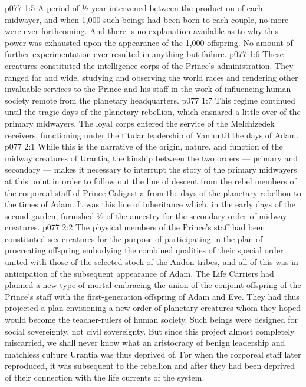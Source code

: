 \vs p077 1:5 A period of ½ year intervened between the production of each midwayer, and when 1,000 such beings had been born to each couple, no more were ever forthcoming. And there is no explanation available as to why this power was exhausted upon the appearance of the 1,000 offspring. No amount of further experimentation ever resulted in anything but failure.
\vs p077 1:6 \pc These creatures constituted the intelligence corps of the Prince’s administration. They ranged far and wide, studying and observing the world races and rendering other invaluable services to the Prince and his staff in the work of influencing human society remote from the planetary headquarters.
\vs p077 1:7 This regime continued until the tragic days of the planetary rebellion, which ensnared a little over  of the primary midwayers. The loyal corps entered the service of the Melchizedek receivers, functioning under the titular leadership of Van until the days of Adam.
\vs p077 2:1 While this is the narrative of the origin, nature, and function of the midway creatures of Urantia, the kinship between the two orders --- primary and secondary --- makes it necessary to interrupt the story of the primary midwayers at this point in order to follow out the line of descent from the rebel members of the corporeal staff of Prince Caligastia from the days of the planetary rebellion to the times of Adam. It was this line of inheritance which, in the early days of the second garden, furnished ½ of the ancestry for the secondary order of midway creatures.
\vs p077 2:2 \pc The physical members of the Prince’s staff had been constituted sex creatures for the purpose of participating in the plan of procreating offspring embodying the combined qualities of their special order united with those of the selected stock of the Andon tribes, and all of this was in anticipation of the subsequent appearance of Adam. The Life Carriers had planned a new type of mortal embracing the union of the conjoint offspring of the Prince’s staff with the first\hyp{}generation offspring of Adam and Eve. They had thus projected a plan envisioning a new order of planetary creatures whom they hoped would become the teacher\hyp{}rulers of human society. Such beings were designed for social sovereignty, not civil sovereignty. But since this project almost completely miscarried, we shall never know what an aristocracy of benign leadership and matchless culture Urantia was thus deprived of. For when the corporeal staff later reproduced, it was subsequent to the rebellion and after they had been deprived of their connection with the life currents of the system.
